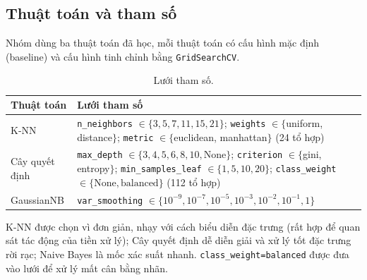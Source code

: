 \documentclass[12pt,a4paper]{article}
\begin{document}
\subsection{Thuật toán và tham số}
Nhóm dùng ba thuật toán đã học, mỗi thuật toán có cấu hình mặc định (baseline) và cấu hình tinh chỉnh bằng \texttt{GridSearchCV}.
\begin{table}[H]\centering\small
\begin{tabular}{@{}lp{9.5cm}@{}}\toprule
Thuật toán & Lưới tham số\\\midrule
K-NN & \texttt{n\_neighbors} $\in\{3,5,7,11,15,21\}$; \texttt{weights} $\in\{$uniform, distance$\}$; \texttt{metric} $\in\{$euclidean, manhattan$\}$ (24 tổ hợp)\\
Cây quyết định & \texttt{max\_depth} $\in\{3,4,5,6,8,10,\text{None}\}$; \texttt{criterion} $\in\{$gini, entropy$\}$; \texttt{min\_samples\_leaf} $\in\{1,5,10,20\}$; \texttt{class\_weight} $\in\{\text{None},\text{balanced}\}$ (112 tổ hợp)\\
GaussianNB & \texttt{var\_smoothing} $\in\{10^{-9},10^{-7},10^{-5},10^{-3},10^{-2},10^{-1},1\}$\\\bottomrule
\end{tabular}\caption{Lưới tham số.}\end{table}
K-NN được chọn vì đơn giản, nhạy với cách biểu diễn đặc trưng (rất hợp để quan sát tác động của tiền xử lý); Cây quyết định dễ diễn giải
và xử lý tốt đặc trưng rời rạc; Naive Bayes là mốc xác suất nhanh. \texttt{class\_weight=balanced} được đưa vào lưới để xử lý mất cân bằng nhãn.

\end{document}
